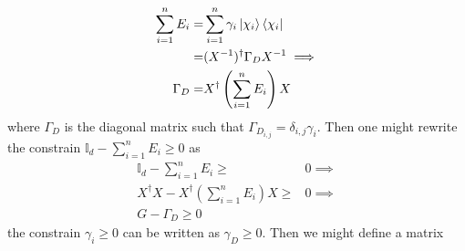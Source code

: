 \documentclass[12pt,letterpaper]{article}
\begin{document}
\begin{multicols}{2}
\begin{align}
\sum_{i=1}^{n}E_i=&\sum_{i=1}^{n}\gamma_i\ket{\chi_i}\bra{\chi_i}\\
=&(X^{-1})^\dagger\Gamma_DX^{-1}\implies\\
\Gamma_D=&X^\dagger\left(\sum_{i=1}^{n}E_i\right)X
\end{align}
where $\Gamma_D$ is the diagonal matrix such that $\Gamma_{D_{i,j}}=\delta_{i,j}\gamma_i$. Then one might rewrite the constrain $\mathbb{I}_d-\sum_{i=1}^{n}E_i\geq0$ as 
\begin{align}
\mathbb{I}_d-\sum_{i=1}^{n}E_i\geq&0\implies\\
X^\dagger X-X^\dagger\left(\sum_{i=1}^{n}E_i\right)X\geq&0\implies\\
G-\Gamma_D\geq0
\end{align}
the constrain $\gamma_i\geq0$ can be written as $\gamma_D\geq0$. Then we might define a matrix 


\end{multicols}

\newpage



 
\end{document}
